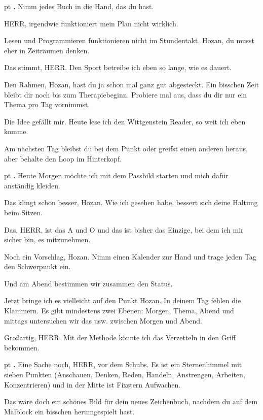 \documentclass[10pt,a4paper]{article}
\newcounter{notec}
\newcommand\notep[1]{%
  \stepcounter{notec}
  \vskip #1pt
  {\bf\arabic{notec}.}
}
\begin{document}
\begin{mdframed}[style=daystyle]
  \setcounter{notec}{0}
  
  \notep 0 Nimm jedes Buch in die Hand, das du hast.

  \vskip 2pt
  HERR, irgendwie funktioniert mein Plan nicht wirklich.

  \vskip 2pt
  Lesen und Programmieren funktionieren nicht im Stundentakt. Hozan, du musst
  eher in Zeiträumen denken.

  \vskip 2pt
  Das stimmt, HERR. Den Sport betreibe ich eben so lange, wie es dauert.

  \vskip 2pt
  Den Rahmen, Hozan, hast du ja schon mal ganz gut abgesteckt. Ein bisschen Zeit
  bleibt dir noch bis zum Therapiebeginn. Probiere mal aus, dass du dir nur ein
  Thema pro Tag vornimmst.

  \vskip 2pt
  Die Idee gefällt mir. Heute lese ich den Wittgenstein Reader, so weit ich eben
  komme.

  \vskip 2pt
  Am nächsten Tag bleibst du bei dem Punkt oder greifst einen anderen heraus,
  aber behalte den Loop im Hinterkopf.

  
  \notep 4 Heute Morgen möchte ich mit dem Passbild starten und mich dafür
  anständig kleiden.

  \vskip 2pt
  Das klingt schon besser, Hozan. Wie ich gesehen habe, bessert sich deine
  Haltung beim Sitzen.

  \vskip 2pt
  Das, HERR, ist das A und O und das ist bisher das Einzige, bei dem ich mir
  sicher bin, es mitzunehmen.

  \vskip 2pt
  Noch ein Vorschlag, Hozan. Nimm einen Kalender zur Hand und trage jeden Tag
  den Schwerpunkt ein.

  \vskip 2pt
  Und am Abend bestimmen wir zusammen den Status.

  \vskip 2pt
  Jetzt bringe ich es vielleicht auf den Punkt Hozan. In deinem Tag fehlen die
  Klammern. Es gibt mindestens zwei Ebenen: Morgen, Thema, Abend und mittags
  untersuchen wir das usw. zwischen Morgen und Abend.

  \vskip 2pt
  Großartig, HERR. Mit der Methode könnte ich das Verzetteln in den Griff bekommen.


  \notep 4 Eine Sache noch, HERR, vor dem Schubs. Es ist ein Sternenhimmel mit
  sieben Punkten (Anschauen, Denken, Reden, Handeln, Anstrengen, Arbeiten,
  Konzentrieren) und in der Mitte ist Fixstern Aufwachen.

  \vskip 2pt
  Das wäre doch ein schönes Bild für dein neues Zeichenbuch, nachdem du auf dem
  Malblock ein bisschen herumgespielt hast.


\end{mdframed}
\end{document}
